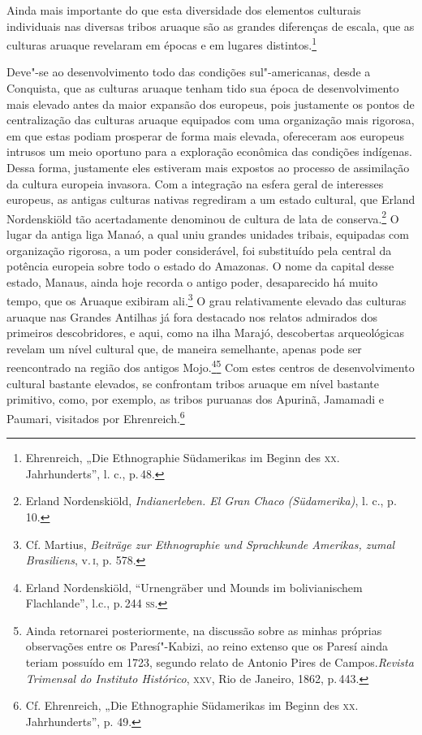 Ainda mais importante do que esta diversidade dos elementos culturais
individuais nas diversas tribos aruaque são as grandes diferenças de
escala, que as culturas aruaque revelaram em épocas e em lugares
distintos.\footnote{Ehrenreich, „Die Ethnographie Südamerikas im Beginn
  des \textsc{xx}. Jahrhunderts'', l. c., p.\,48.}

Deve"-se ao desenvolvimento todo das condições sul"-americanas, desde a
Conquista, que as culturas aruaque tenham tido sua época de desenvolvimento
mais elevado antes da maior expansão dos europeus, pois justamente os
pontos de centralização das culturas aruaque equipados com uma
organização mais rigorosa, em que estas podiam prosperar de forma mais
elevada, ofereceram aos europeus intrusos um meio oportuno para a
exploração econômica das condições indígenas. Dessa forma, justamente
eles estiveram mais expostos ao processo de assimilação da cultura
europeia invasora. Com a integração na esfera geral de interesses
europeus, as antigas culturas nativas regrediram a um estado cultural,
que Erland Nordenskiöld tão acertadamente denominou de cultura de lata
de conserva.\footnote{Erland Nordenskiöld, \textit{Indianerleben. El Gran
  Chaco (Südamerika)}, l. c., p.\,10.} O lugar da antiga liga Manaó, a
qual uniu grandes unidades tribais, equipadas com organização rigorosa,
a um poder considerável, foi substituído pela central da potência
europeia sobre todo o estado do Amazonas. O nome da capital desse
estado, Manaus, ainda hoje recorda o antigo poder, desaparecido há muito
tempo, que os Aruaque exibiram ali.\footnote{Cf. Martius, \textit{Beiträge
  zur Ethnographie und Sprachkunde Amerikas, zumal Brasiliens}, v.\,\textsc{i}, p.
  578.} O grau relativamente elevado das culturas aruaque nas Grandes
Antilhas já fora destacado nos relatos admirados dos primeiros
descobridores, e aqui, como na ilha Marajó, descobertas arqueológicas
revelam um nível cultural que, de maneira semelhante, apenas pode ser
reencontrado na região dos antigos Mojo.\footnote{Erland Nordenskiöld,
  ``Urnengräber und Mounds im bolivianischem Flachlande'', l.c., p.\,244
  \textsc{ss}.}\footnote{Ainda retornarei posteriormente, na discussão sobre as minhas
próprias observações entre os Paresí"-Kabizi, ao reino extenso que os
Paresí ainda teriam possuído em 1723, segundo relato de Antonio Pires
de Campos.{\textit{Revista Trimensal do Instituto Histórico}, \textsc{xxv},
  Rio de Janeiro, 1862, p.\,443.}} Com estes centros de desenvolvimento
cultural bastante elevados, se confrontam tribos aruaque em nível
bastante primitivo, como, por exemplo, as tribos puruanas dos Apurinã,
Jamamadi e Paumari, visitados por Ehrenreich.\footnote{Cf. Ehrenreich,
  „Die Ethnographie Südamerikas im Beginn des \textsc{xx}. Jahrhunderts'', p.
  49.}

